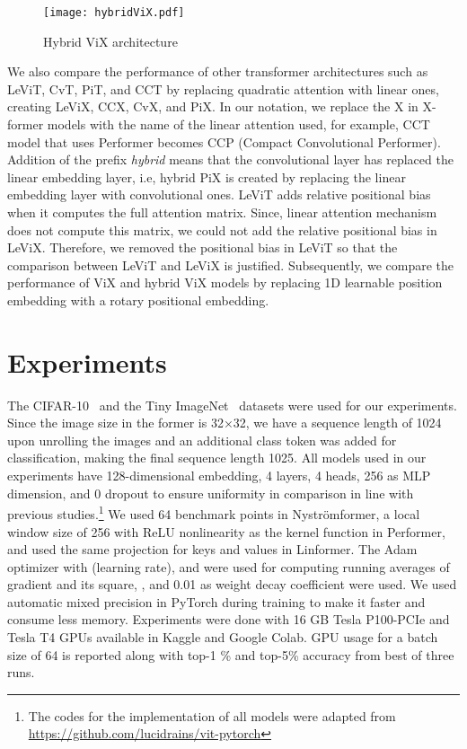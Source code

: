 \documentclass{article}
\begin{document}
\begin{figure}[h]
\centering
\texttt{[image: hybridViX.pdf]}
\caption{Hybrid ViX architecture }
\label{fig:x HybridViX}
\end{figure}

We also compare the performance of other transformer architectures such as LeViT, CvT, PiT, and CCT by replacing quadratic attention with linear ones, creating LeViX, CCX, CvX, and PiX. In our notation, we replace the X in X-former models with the name of the linear attention used, for example, CCT model that uses Performer becomes CCP (Compact Convolutional Performer). Addition of the prefix \emph{hybrid} means that the convolutional layer has replaced the linear embedding layer, i.e, hybrid PiX is created by replacing the linear embedding layer with convolutional ones. LeViT adds relative positional bias when it computes the full attention matrix. Since, linear attention mechanism does not compute this matrix, we could not add the relative positional bias in LeViX.  Therefore, we removed the positional bias in LeViT so that the comparison between LeViT and LeViX is justified. Subsequently, we compare the performance of ViX and hybrid ViX models by replacing 1D learnable position embedding with a rotary positional embedding.


\section{Experiments}

The CIFAR-10~\cite{Krizhevsky09learningmultiple} and the Tiny ImageNet~\cite{Le2015TinyIV} datasets were used for our experiments. Since the image size in the former is 32×32, we have a sequence length of 1024 upon unrolling the images and an additional class token was added for classification, making the final sequence length 1025. All models used in our experiments have 128-dimensional embedding, 4 layers, 4 heads, 256 as MLP dimension, and 0 dropout to ensure uniformity in comparison in line with previous studies.\footnote{The codes for the implementation of all models were adapted from \href{https://github.com/lucidrains/vit-pytorch}{https://github.com/lucidrains/vit-pytorch}} We used 64 benchmark points in Nyströmformer, a local window size of 256 with ReLU nonlinearity as the kernel function in Performer, and used the same projection for keys and values in Linformer. The Adam optimizer with  (learning rate),  and  were used for computing running averages of gradient and its square, , and 0.01 as weight decay coefficient were used. We used automatic mixed precision in PyTorch during training to make it faster and consume less memory. Experiments were done with 16 GB Tesla P100-PCIe and Tesla T4 GPUs available in Kaggle and Google Colab. GPU usage for a batch size of 64 is reported along with top-1 \% and top-5\% accuracy from best of three runs.
\end{document}
